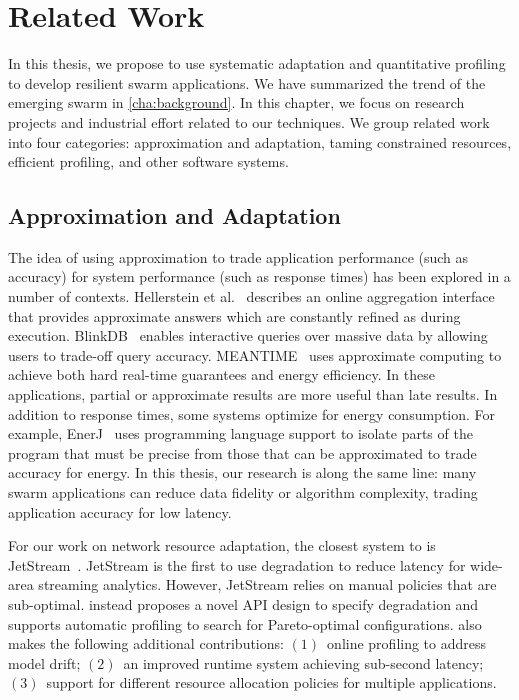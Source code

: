 \documentclass[thesis.tex]{subfiles}
\begin{document}
\chapter{Related Work}
\label{cha:related-work}

In this thesis, we propose to use systematic adaptation and quantitative
profiling to develop resilient swarm applications. We have summarized the trend
of the emerging swarm in \autoref{cha:background}. In this chapter, we focus on
research projects and industrial effort related to our techniques. We group
related work into four categories: approximation and adaptation, taming
constrained resources, efficient profiling, and other software systems.

\section{Approximation and Adaptation}
\label{sec:appr-adapt}

The idea of using approximation to trade application performance (such as
accuracy) for system performance (such as response times) has been explored in a
number of contexts.  Hellerstein et al.~\cite{hellerstein1997online} describes
an online aggregation interface that provides approximate answers which are
constantly refined as during execution. BlinkDB~\cite{agarwal2013blinkdb}
enables interactive queries over massive data by allowing users to trade-off
query accuracy. MEANTIME~\cite{farrell2016meantime} uses approximate computing
to achieve both hard real-time guarantees and energy efficiency. In these
applications, partial or approximate results are more useful than late
results. In addition to response times, some systems optimize for energy
consumption. For example, EnerJ~\cite{sampson2011enerj} uses programming
language support to isolate parts of the program that must be precise from those
that can be approximated to trade accuracy for energy. In this thesis, our
research is along the same line: many swarm applications can reduce data
fidelity or algorithm complexity, trading application accuracy for low latency.


For our work on network resource adaptation, the closest system to \awstream{}
is JetStream~\cite{rabkin2014aggregation}. JetStream is the first to use
degradation to reduce latency for wide-area streaming analytics. However,
JetStream relies on manual policies that are sub-optimal. \awstream{} instead
proposes a novel API design to specify degradation and supports automatic
profiling to search for Pareto-optimal configurations. \awstream{} also makes
the following additional contributions: $(1)$~online profiling to address model
drift; $(2)$~an improved runtime system achieving sub-second latency;
$(3)$~support for different resource allocation policies for multiple
applications.
\end{document}
